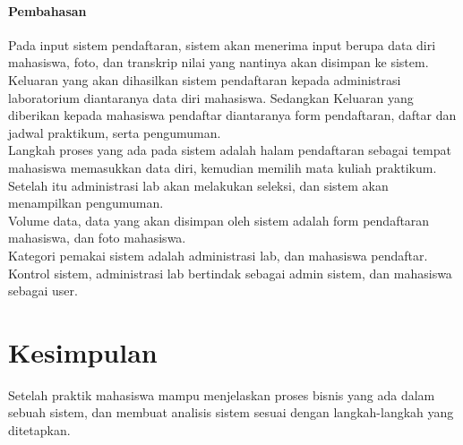 \documentclass[a4paper,12pt]{article}
\begin{document}
\paragraph*{Pembahasan\\}
Pada input sistem pendaftaran, sistem akan menerima input berupa data diri mahasiswa, foto, dan transkrip nilai yang
nantinya akan disimpan ke sistem.\\

Keluaran yang akan dihasilkan sistem pendaftaran kepada administrasi laboratorium diantaranya data diri mahasiswa.
Sedangkan Keluaran yang diberikan kepada mahasiswa pendaftar diantaranya form pendaftaran, daftar dan jadwal praktikum,
serta pengumuman.\\

Langkah proses yang ada pada sistem adalah halam pendaftaran sebagai tempat mahasiswa memasukkan data diri, kemudian
memilih mata kuliah praktikum. Setelah itu administrasi lab akan melakukan seleksi, dan sistem akan menampilkan
pengumuman.\\

Volume data, data yang akan disimpan oleh sistem adalah form pendaftaran mahasiswa, dan foto mahasiswa.\\

Kategori pemakai sistem adalah administrasi lab, dan mahasiswa pendaftar.\\

Kontrol sistem, administrasi lab bertindak sebagai admin sistem, dan mahasiswa sebagai user.

\section{Kesimpulan}
Setelah praktik mahasiswa mampu menjelaskan proses bisnis yang ada dalam sebuah sistem, dan membuat analisis sistem
sesuai dengan langkah-langkah yang ditetapkan.
    
\end{document}
